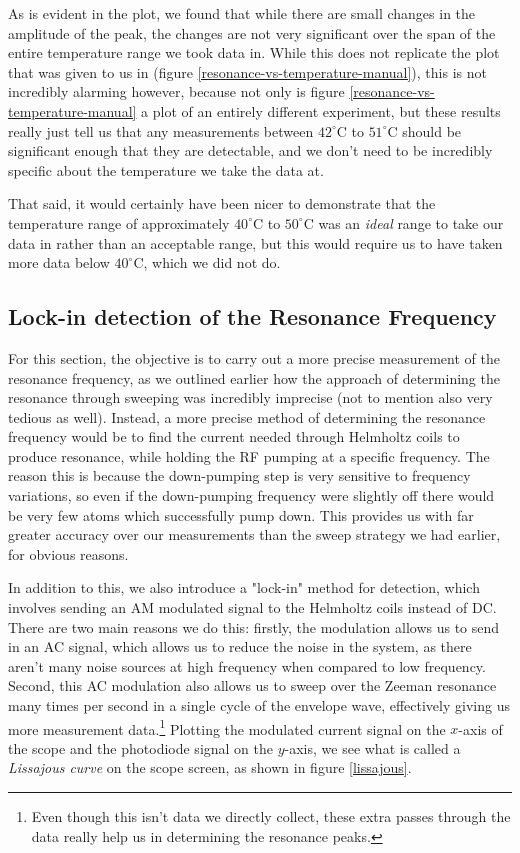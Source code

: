 \documentclass[10pt]{article}
\begin{document}
	As is evident in the plot, we found that while there are small changes in the
	amplitude of the peak, the changes are not very significant over the span of the
	entire temperature range we took data in. While this does not replicate the plot
	that was given to us in \cite{lab-manual} (figure
	\ref{resonance-vs-temperature-manual}), this is not incredibly
	alarming however, because not only is figure
	\ref{resonance-vs-temperature-manual} a plot of an entirely
	different experiment, but these results really just tell us that any measurements
	between \( 42^{\circ} \)C to \( 51^{\circ} \)C should be significant enough 
	that they are detectable, and we don't need to be incredibly specific about the 
	temperature we take the data at. 

	That said, it would certainly have been nicer to demonstrate that the temperature
	range of approximately \( 40^{\circ} \)C to \( 50^{\circ} \)C was 
	an \textit{ideal} range
	to take our data in rather than an acceptable range, but this would require us to
	have taken more data below \( 40^{\circ} \)C, which we did not do. 

	\subsection{Lock-in detection of the Resonance Frequency} 
	\label{lock-in}

	For this section, the objective is to carry out a more precise measurement of the
	resonance frequency, as we outlined earlier how the approach of determining the
	resonance through sweeping was incredibly imprecise (not to mention also very
	tedious as well). Instead, a more precise method of determining the resonance
	frequency would be to find the current needed through Helmholtz coils to produce
	resonance, while holding the RF pumping at a specific frequency. The reason this
	is because the down-pumping step is very sensitive to frequency variations, so
	even if the down-pumping frequency were slightly off there would be very few
	atoms which successfully pump down. This provides us with far greater accuracy
	over our measurements than the sweep strategy we had earlier, for obvious
	reasons. 

	In addition to this, we also introduce a "lock-in" method for detection, which
	involves sending an AM modulated signal to the Helmholtz coils instead of DC.
	There are two main reasons we do this: firstly, the modulation allows us to send
	in an AC signal, which allows us to reduce the noise in the system, as there
	aren't many noise sources at high frequency when compared to low frequency.
	Second, this AC modulation also allows us to sweep over the Zeeman resonance
	many times per second in a single cycle of the envelope wave, effectively giving
	us more measurement data.\footnote{Even though this isn't data we directly
		collect, these extra passes through the data really help us in determining
	the resonance peaks.} Plotting the modulated current signal on the \( x \)-axis
	of the scope and the photodiode signal on the \( y \)-axis, we see what is called
	a \textit{Lissajous curve} on the scope screen, as shown in figure
	\ref{lissajous}.
\end{document}
